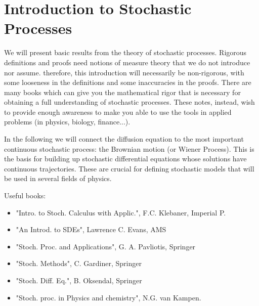 
\section{Introduction to Stochastic Processes}
We will present basic results from the theory of stochastic processes. Rigorous definitions and proofs need notions of measure theory that we do not introduce nor assume. therefore, this introduction will necessarily be non-rigorous, with some looseness in the definitions and some inaccuracies in the proofs. There are many books which can give you the mathematical rigor that is necessary for obtaining a full understanding of stochastic processes. These notes, instead, wish to provide enough awareness to make you able to use the tools in applied problems (in physics, biology, finance...).

In the following we will connect the diffusion equation to the most important continuous stochastic process: the Brownian motion (or Wiener Process). This is the basis for building up stochastic differential equations whose solutions have continuous trajectories. These are crucial for defining stochastic models that will be used in several fields of physics.

Useful books:
\begin{itemize}
    \item "Intro. to Stoch. Calculus with Applic.", F.C. Klebaner, Imperial P.
    \item "An Introd. to SDEs", Lawrence C. Evans, AMS
    \item "Stoch. Proc. and Applications", G. A. Pavliotis, Springer
    \item "Stoch. Methods", C. Gardiner, Springer
    \item "Stoch. Diff. Eq.", B. Oksendal, Springer
    \item "Stoch. proc. in Physics and chemistry", N.G. van Kampen.
\end{itemize}

